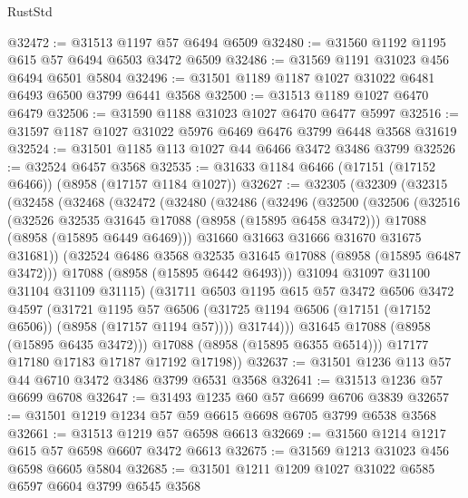 \begin{lexlean}{RustStd}
\begin{coremodule}
@32472 := @31513 @1197 @57 @6494 @6509
@32480 := @31560 @1192 @1195 @615 @57 @6494 @6503 @3472 @6509
@32486 := @31569 @1191 @31023 @456 @6494 @6501 @5804
@32496 := @31501 @1189 @1187 @1027 @31022 @6481 @6493 @6500 @3799 @6441 @3568
@32500 := @31513 @1189 @1027 @6470 @6479
@32506 := @31590 @1188 @31023 @1027 @6470 @6477 @5997
@32516 := @31597 @1187 @1027 @31022 @5976 @6469 @6476 @3799 @6448 @3568 @31619
@32524 := @31501 @1185 @113 @1027 @44 @6466 @3472 @3486 @3799
@32526 := @32524 @6457 @3568
@32535 := @31633 @1184 @6466 (@17151 (@17152 @6466)) (@8958 (@17157 @1184 @1027))
@32627 := @32305
    (@32309
      (@32315
        (@32458
          (@32468
            (@32472
              (@32480
                (@32486
                  (@32496
                    (@32500
                      (@32506
                        (@32516
                          (@32526 @32535 @31645 @17088 (@8958 (@15895 @6458 @3472)))
                          @17088
                          (@8958 (@15895 @6449 @6469)))
                        @31660
                        @31663
                        @31666
                        @31670
                        @31675
                        @31681))
                    (@32524 @6486 @3568 @32535 @31645 @17088 (@8958 (@15895 @6487 @3472)))
                    @17088
                    (@8958 (@15895 @6442 @6493)))
                  @31094
                  @31097
                  @31100
                  @31104
                  @31109
                  @31115)
                (@31711
                  @6503
                  @1195
                  @615
                  @57
                  @3472
                  @6506
                  @3472
                  @4597
                  (@31721
                    @1195
                    @57
                    @6506
                    (@31725 @1194 @6506 (@17151 (@17152 @6506)) (@8958 (@17157 @1194 @57))))
                  @31744)))
            @31645
            @17088
            (@8958 (@15895 @6435 @3472)))
          @17088
          (@8958 (@15895 @6355 @6514)))
        @17177
        @17180
        @17183
        @17187
        @17192
        @17198))
@32637 := @31501 @1236 @113 @57 @44 @6710 @3472 @3486 @3799 @6531 @3568
@32641 := @31513 @1236 @57 @6699 @6708
@32647 := @31493 @1235 @60 @57 @6699 @6706 @3839
@32657 := @31501 @1219 @1234 @57 @59 @6615 @6698 @6705 @3799 @6538 @3568
@32661 := @31513 @1219 @57 @6598 @6613
@32669 := @31560 @1214 @1217 @615 @57 @6598 @6607 @3472 @6613
@32675 := @31569 @1213 @31023 @456 @6598 @6605 @5804
@32685 := @31501 @1211 @1209 @1027 @31022 @6585 @6597 @6604 @3799 @6545 @3568

\end{coremodule}
\end{lexlean}
